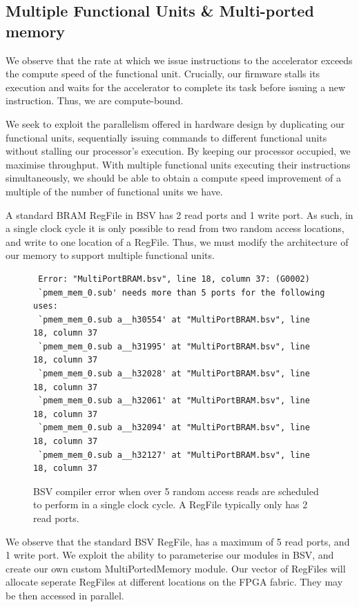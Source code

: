 \documentclass[a4paper,8pt]{report}
\begin{document}
\subsection{Multiple Functional Units \& Multi-ported memory}
We observe that the rate at which we issue instructions to the accelerator
exceeds the compute speed of the functional unit. Crucially, our firmware stalls
its execution and waits for the accelerator to complete its task before issuing
a new instruction. Thus, we are compute-bound.

We seek to exploit the parallelism offered in hardware design by duplicating our
functional units, sequentially issuing commands to different functional units
without stalling our processor's execution. By keeping our processor occupied,
we maximise throughput. With multiple functional units executing their
instructions simultaneously, we should be able to obtain a compute speed
improvement of a multiple of the number of functional units we have.

A standard BRAM RegFile in BSV has 2 read ports and 1 write port. As such, in a
single clock cycle it is only possible to read from two random access locations,
and write to one location of a RegFile. Thus, we must modify the architecture of
our memory to support multiple functional units.

\begin{figure}[h]
\scriptsize
\begin{verbatim}
 Error: "MultiPortBRAM.bsv", line 18, column 37: (G0002)
 `pmem_mem_0.sub' needs more than 5 ports for the following uses:
 `pmem_mem_0.sub a__h30554' at "MultiPortBRAM.bsv", line 18, column 37
 `pmem_mem_0.sub a__h31995' at "MultiPortBRAM.bsv", line 18, column 37
 `pmem_mem_0.sub a__h32028' at "MultiPortBRAM.bsv", line 18, column 37
 `pmem_mem_0.sub a__h32061' at "MultiPortBRAM.bsv", line 18, column 37
 `pmem_mem_0.sub a__h32094' at "MultiPortBRAM.bsv", line 18, column 37
 `pmem_mem_0.sub a__h32127' at "MultiPortBRAM.bsv", line 18, column 37
\end{verbatim}
\normalsize
\caption{BSV compiler error when over 5 random access reads are scheduled to
  perform in a single clock cycle. A RegFile typically only has 2 read ports.}
\end{figure}

We observe that the standard BSV RegFile, has a maximum of 5 read ports, and 1
write port. We exploit the ability to parameterise our modules in BSV, and
create our own custom MultiPortedMemory module. Our vector of RegFiles will
allocate seperate RegFiles at different locations on the FPGA fabric. They may
be then accessed in parallel.
\end{document}
